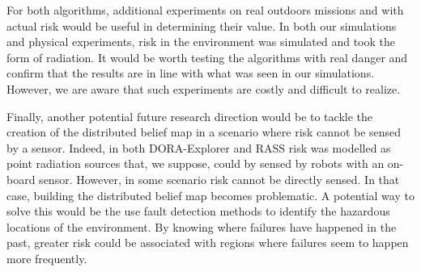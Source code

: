 For both algorithms, additional experiments on real outdoors missions and with actual risk would be useful in determining their value. In both our simulations and physical experiments, risk in the environment was simulated and took the form of radiation. It would be worth testing the algorithms with real danger and confirm that the results are in line with what was seen in our simulations. However, we are aware that such experiments are costly and difficult to realize.

Finally, another potential future research direction would be to tackle the creation of the distributed belief map in a scenario where risk cannot be sensed by a sensor. Indeed, in both DORA-Explorer and RASS risk was modelled as point radiation sources that, we suppose, could by sensed by robots with an on-board sensor. However, in some scenario risk cannot be directly sensed. In that case, building the distributed belief map becomes problematic. A potential way to solve this would be the use fault detection methods to identify the hazardous locations of the environment. By knowing where failures have happened in the past, greater risk could be associated with regions where failures seem to happen more frequently. 

